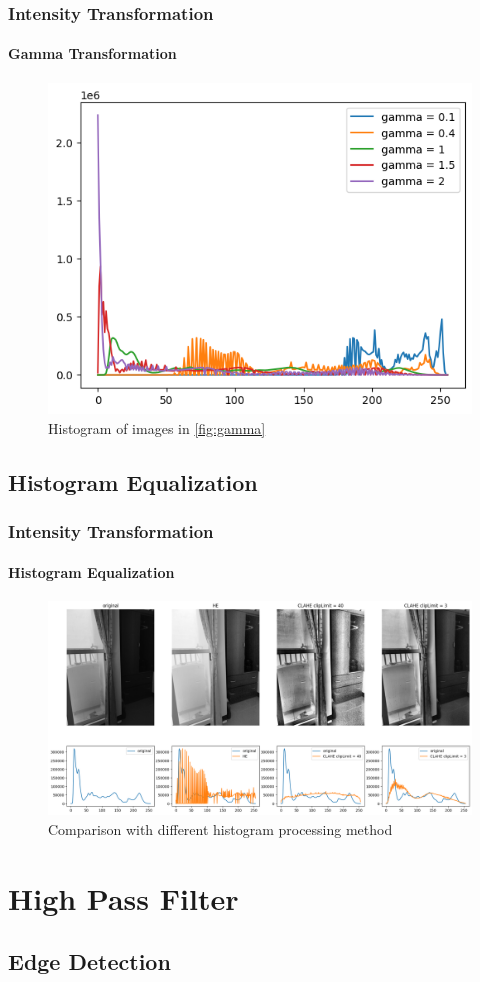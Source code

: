 \documentclass[
	11pt, %
	aspectratio=169, %
]{beamer}
\begin{document}
		\begin{frame}
			\frametitle{Intensity Transformation}
			\framesubtitle{Gamma Transformation}

			\begin{figure}[htbp]
				\centering
				 \includegraphics[width = 0.5\linewidth]{gamma_hist.png}
				 \caption{Histogram of images in \cref{fig:gamma}}
			 \end{figure}
		\end{frame}

	\subsection{Histogram Equalization}

		\begin{frame}
			\frametitle{Intensity Transformation}
			\framesubtitle{Histogram Equalization}

			\begin{figure}[htbp]
				\includegraphics[width = 0.8\linewidth]{he_img_hist.png}
				\caption{Comparison with different histogram processing method}
			\end{figure}
		\end{frame}

\section{High Pass Filter}

	\subsection{Edge Detection}
\end{document}
